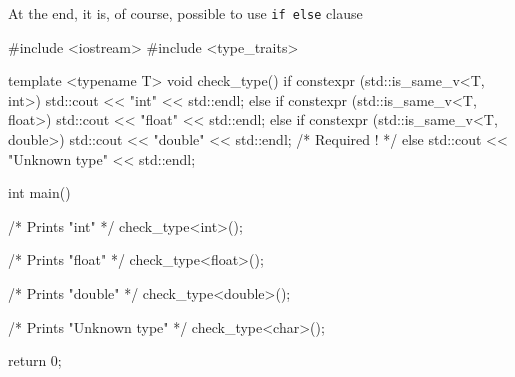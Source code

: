 \documentclass[../main]{subfiles}
\begin{document}
    At the end, it is, of course, possible to use \texttt{if else} clause
\begin{Code}
    #include <iostream>
    #include <type_traits>
    
    template <typename T>
    void check_type()
    {
        if constexpr (std::is_same_v<T, int>)
        {
            std::cout << "int" << std::endl;
        }
        else if constexpr (std::is_same_v<T, float>)
        {
            std::cout << "float" << std::endl;
        }
        else if constexpr (std::is_same_v<T, double>)
        {
            std::cout << "double" << std::endl;
        }
        /* Required ! */
        else
        {
            std::cout << "Unknown type" << std::endl;
        }
    }
    
    int main()
    {
        /* Prints "int" */
        check_type<int>();
        
        /* Prints "float" */
        check_type<float>();
        
        /* Prints "double" */
        check_type<double>();
        
        /* Prints "Unknown type" */
        check_type<char>();
    
        return 0;
    }
\end{Code}
\end{document}
